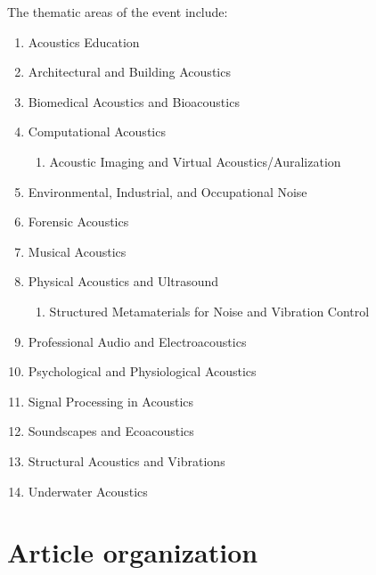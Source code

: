 The thematic areas of the event include:
%	
\begin{enumerate}[topsep=0ex] \itemsep=0.0pt
    \item Acoustics Education
    \item Architectural and Building Acoustics
    \item Biomedical Acoustics and Bioacoustics
    \item Computational Acoustics
		\vspace{-0.25em}
    \begin{enumerate}[noitemsep,topsep=0ex] 
        \item Acoustic Imaging and Virtual Acoustics/Auralization
    \end{enumerate}
    \item Environmental, Industrial, and Occupational Noise
    \item Forensic Acoustics
    \item Musical Acoustics
    \item Physical Acoustics and Ultrasound
		\vspace{-0.25em}
    \begin{enumerate}[noitemsep,topsep=0ex]
        \item Structured Metamaterials for Noise and Vibration Control
    \end{enumerate}
    \item Professional Audio and Electroacoustics
    \item Psychological and Physiological Acoustics
    \item Signal Processing in Acoustics
    \item Soundscapes and Ecoacoustics
    \item Structural Acoustics and Vibrations
    \item Underwater Acoustics
\end{enumerate}

	
\section{Article organization}

